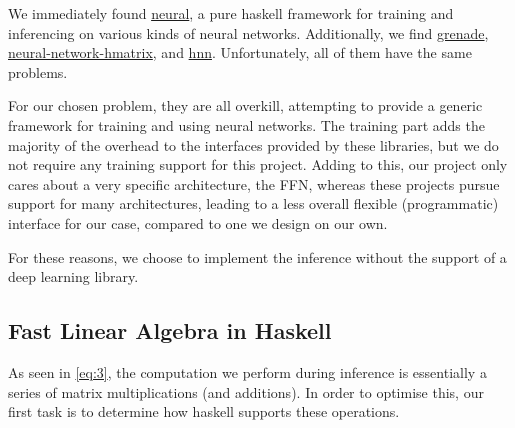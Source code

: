 \documentclass[12pt, titlepage]{article}
\begin{document}
We immediately found \href{https://hackage.haskell.org/package/neural}{neural}, a pure haskell framework for training and inferencing on various kinds of neural networks. Additionally, we find \href{https://github.com/HuwCampbell/grenade}{grenade}, \href{https://hackage.haskell.org/package/neural-network-hmatrix}{neural-network-hmatrix}, and \href{https://hackage.haskell.org/package/hnn}{hnn}. Unfortunately, all of them have the same problems.\bigskip

For our chosen problem, they are all overkill, attempting to provide a generic framework for training and using neural networks. The training part adds the majority of the overhead to the interfaces provided by these libraries, but we do not require any training support for this project. Adding to this, our project only cares about a very specific architecture, the FFN, whereas these projects pursue support for many architectures, leading to a less overall flexible (programmatic) interface for our case, compared to one we design on our own.\bigskip

For these reasons, we choose to implement the inference without the support of a deep learning library.

\subsection{Fast Linear Algebra in Haskell} \label{sec:4.2}
As seen in \eqref{eq:3}, the computation we perform during inference is essentially a series of matrix multiplications (and additions). In order to optimise this, our first task is to determine how haskell supports these operations.\bigskip
\end{document}
